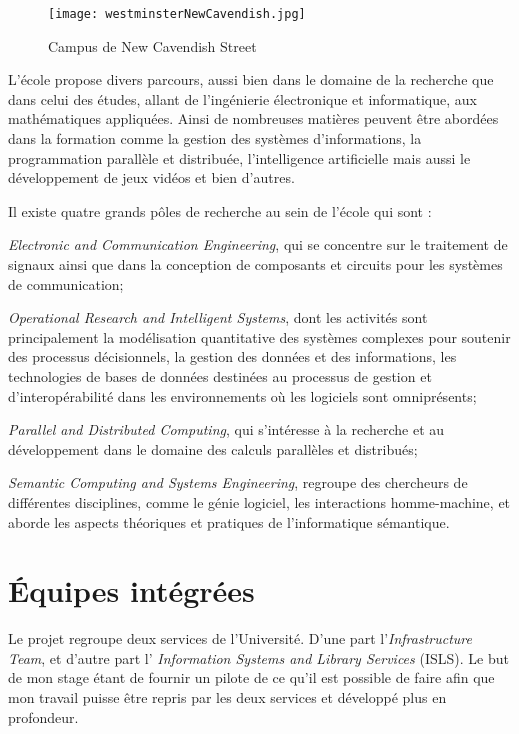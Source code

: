 \begin{figure}[!ht]
	\centering
	\texttt{[image: westminsterNewCavendish.jpg]}
	\caption{Campus de New Cavendish Street}
	\label{figure:westminsterNewCavendish}

\end{figure}

L'\'ecole propose divers parcours, aussi bien dans le domaine de la recherche que dans celui des \'etudes, allant de l'ing\'enierie \'electronique et informatique, aux math\'ematiques appliqu\'ees.
Ainsi de nombreuses mati\`eres peuvent \^etre abord\'ees dans la formation comme la gestion des syst\`emes d'informations, la programmation parall\`ele et distribu\'ee, l'intelligence artificielle mais aussi le d\'eveloppement de jeux vid\'eos et bien d'autres.

\noindent Il existe quatre grands p\^oles de recherche au sein de l'\'ecole qui sont :

\textit{Electronic and Communication Engineering}, qui se concentre sur le traitement de signaux ainsi que dans la conception de composants et circuits pour les syst\`emes de communication;

\textit{Operational Research and Intelligent Systems}, dont les activit\'es sont principalement la mod\'elisation quantitative des syst\`emes complexes pour soutenir des processus d\'ecisionnels, la gestion des donn\'ees et des informations, les technologies de bases de donn\'ees destin\'ees au processus de gestion et d'interop\'erabilit\'e dans les environnements o\`u les logiciels sont omnipr\'esents;

\textit{Parallel and Distributed Computing}, qui s'int\'eresse \`a la recherche et au d\'eveloppement dans le domaine des calculs parall\`eles et distribu\'es;

\textit{Semantic Computing and Systems Engineering}, regroupe des chercheurs de diff\'erentes disciplines, comme le g\'enie logiciel, les interactions homme-machine, et aborde les aspects th\'eoriques et pratiques de l'informatique s\'emantique.

\section{\'Equipes int\'egr\'ees}

Le projet \YuukouII{} regroupe deux services de l'Universit\'e. 
D'une part l'\textit{Infrastructure Team}, et d'autre part l' \textit{Information Systems and Library Services} (ISLS).
Le but de mon stage \'etant de fournir un pilote de ce qu'il est possible de faire afin que mon travail puisse \^etre repris par les deux services et d\'evelopp\'e plus en profondeur.

